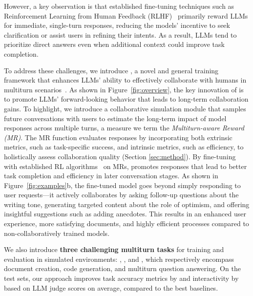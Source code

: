 However,
a key observation is that established fine-tuning techniques such as Reinforcement Learning from Human Feedback (RLHF)~\citep{rlhf} primarily reward 
LLMs for immediate, single-turn responses, reducing the models' incentive to seek clarification or assist users in refining their intents. As a result, LLMs tend to prioritize direct answers even when additional context could improve task completion.

To address these challenges, we introduce {\bf \name{}}, a novel and general training framework that enhances LLMs' ability to effectively collaborate with humans in multiturn scenarios~\citep{neural_approach, rethinking_conv_agent, clarify_survey}. 
As shown in Figure~\ref{fig:overview},
the key innovation of \name{} is to promote LLMs' forward-looking behavior that %
leads to long-term collaboration gains. 
To highlight, 
we introduce a collaborative simulation module that samples future conversations with users to estimate the long-term impact of model responses across multiple turns, a measure we term the \textit{Multiturn-aware Reward (MR)}. The MR function evaluates responses by incorporating both extrinsic metrics, such as task-specific success, and intrinsic metrics, such as efficiency, to holistically assess collaboration quality (\cf Section \ref{sec:method}).
By fine-tuning with established RL algorithms~\citep{dpo, ppo} on MRs, \name{} promotes responses that lead to better task completion and efficiency in later conversation stages.
As shown in Figure~\ref{fig:examples}b, the fine-tuned model goes beyond simply responding to user requests---it actively collaborates by asking follow-up questions about the writing tone, generating targeted content about the role of optimism, and offering insightful suggestions such as adding anecdotes. This results in an enhanced user experience, more satisfying documents, and highly efficient processes compared to non-collaboratively trained models.


We also introduce \textbf{three challenging multiturn tasks} for training and evaluation in simulated environments: \doct, \codet, and \mathct, which respectively encompass document creation, code generation, and multiturn question answering. On the test sets, our approach improves task accuracy metrics by \taskimprov and interactivity by \itrimprov based on LLM judge scores on average, compared to the best baselines.


